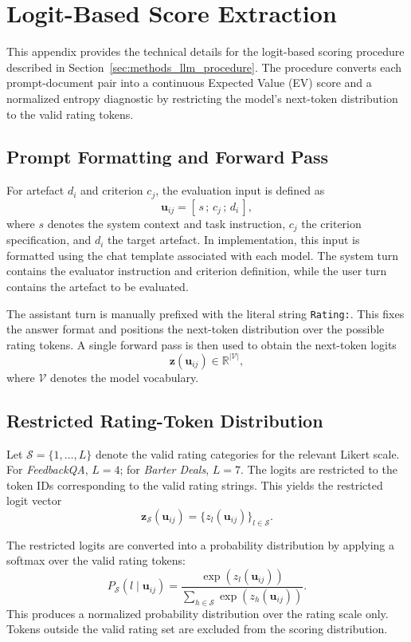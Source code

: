 
\section{Logit-Based Score Extraction}\label{app:logit_score_extraction}

This appendix provides the technical details for the logit-based scoring procedure described in Section~\ref{sec:methods_llm_procedure}. The procedure converts each prompt-document pair into a continuous Expected Value (EV) score and a normalized entropy diagnostic by restricting the model's next-token distribution to the valid rating tokens.

\subsection{Prompt Formatting and Forward Pass}

For artefact $d_i$ and criterion $c_j$, the evaluation input is defined as
\[
    \mathbf{u}_{ij} = [\, s \,;\, c_j \,;\, d_i \,],
\]
where $s$ denotes the system context and task instruction, $c_j$ the criterion specification, and $d_i$ the target artefact. In implementation, this input is formatted using the chat template associated with each model. The system turn contains the evaluator instruction and criterion definition, while the user turn contains the artefact to be evaluated.

The assistant turn is manually prefixed with the literal string \texttt{Rating:}. This fixes the answer format and positions the next-token distribution over the possible rating tokens. A single forward pass is then used to obtain the next-token logits
\[
    \mathbf{z}(\mathbf{u}_{ij}) \in \mathbb{R}^{|\mathcal{V}|},
\]
where $\mathcal{V}$ denotes the model vocabulary.

\subsection{Restricted Rating-Token Distribution}

Let $\mathcal{S}=\{1,\ldots,L\}$ denote the valid rating categories for the relevant Likert scale. For \textit{FeedbackQA}, $L=4$; for \textit{Barter Deals}, $L=7$. The logits are restricted to the token IDs corresponding to the valid rating strings. This yields the restricted logit vector
\[
    \mathbf{z}_{\mathcal{S}}(\mathbf{u}_{ij})
    =
    \{ z_l(\mathbf{u}_{ij}) \}_{l \in \mathcal{S}}.
\]

The restricted logits are converted into a probability distribution by applying a softmax over the valid rating tokens:
\begin{equation}
P_{\mathcal{S}}(l \mid \mathbf{u}_{ij}) =
\frac{\exp(z_l(\mathbf{u}_{ij}))}
{\sum_{h \in \mathcal{S}} \exp(z_h(\mathbf{u}_{ij}))}.
\end{equation}
This produces a normalized probability distribution over the rating scale only. Tokens outside the valid rating set are excluded from the scoring distribution.

